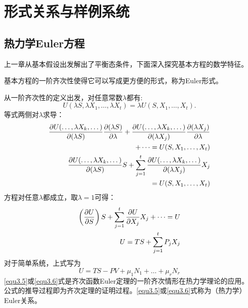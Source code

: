 

\chapter{形式关系与样例系统}
\label{chap3}

\section{热力学Euler方程}
\label{sec3.1}
上一章从基本假设出发解出了平衡态条件，下面深入探究基本方程的数学特征。

基本方程的一阶齐次性使得它可以写成更方便的形式，称为Euler形式。

从一阶齐次性的定义出发，对任意常数$\lambda$都有:
\begin{equation}
\label{equ3.1}
    U(\lambda S, \lambda X_1, \dots, \lambda X_t) = \lambda U(S, X_1, \dots, X_t).
\end{equation}
等式两侧对$\lambda$求导：
\begin{align}
    \frac{ \partial U(\dots, \lambda X_k, \dots)}{\partial (\lambda S)} \frac{\partial (\lambda S)}{\partial \lambda} + \frac{ \partial U(\dots, \lambda X_k, \dots)}{\partial (\lambda X_j)} \frac{\partial (\lambda X_j)}{\partial \lambda} \notag \\
    + \dots = U(S, X_1, \dots, X_t) \label{equ3.2} \\
    \frac{\partial U(\dots, \lambda X_k, \dots)}{\partial (\lambda S)} S + \sum_{j = 1}^t \frac{\partial U(\dots, \lambda X_k, \dots)}{\partial (\lambda X_j)} X_j \notag \\
    = U(S, X_1, \dots, X_t) \label{equ3.3}
\end{align}
方程对任意$\lambda$都成立，取$\lambda = 1$可得：
\begin{align}
    \left( \frac{\partial U}{\partial S} \right) S + \sum_{j = 1}^t \frac{\partial U}{\partial X_j} X_j + \dots = U \label{equ3.4} \\
    U = TS + \sum_{j = 1}^t P_j X_j \label{equ3.5}
\end{align}
对于简单系统，上式写为
\begin{equation}
\label{equ3.6}
    U = TS - PV + \mu_1 N_1 + \dots + \mu_r N_r
\end{equation}
\eqref{equ3.5}或\eqref{equ3.6}式是齐次函数Euler定理的一阶齐次情形在热力学理论的应用。公式的推导过程即为齐次定理的证明过程。\eqref{equ3.5}或\eqref{equ3.6}式称为（热力学）Euler关系。

